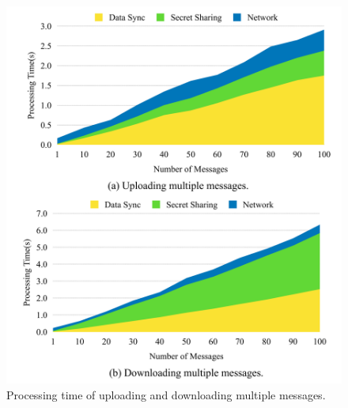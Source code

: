 \documentclass[a4paper,11pt]{report}
\begin{document}
\begin{figure}[t]
	\centering
	\includegraphics[scale=0.15]{multiple_messages}
	\caption{Processing time of uploading and downloading multiple messages.}
	\label{fig:processing_time_multiple_message}
\end{figure}
\end{document}
